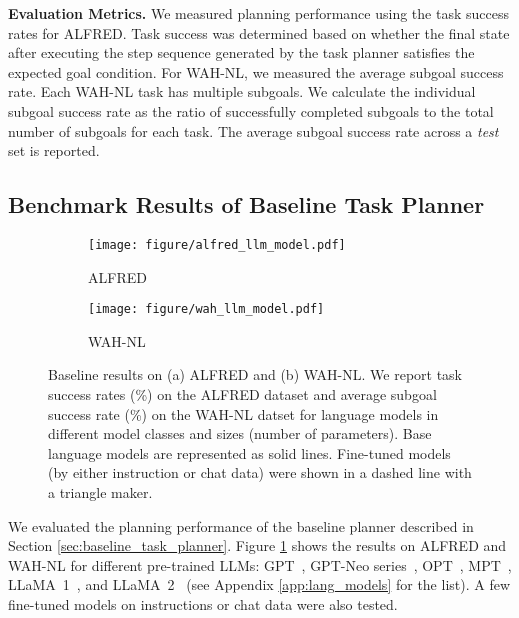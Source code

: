 \textbf{Evaluation Metrics.} We measured planning performance using the task success rates for ALFRED. Task success was determined based on whether the final state after executing the step sequence generated by the task planner satisfies the expected goal condition. For WAH-NL, we measured the average subgoal success rate. Each WAH-NL task has multiple subgoals. We calculate the individual subgoal success rate as the ratio of successfully completed subgoals to the total number of subgoals for each task. The average subgoal success rate across a \textit{test} set is reported.

\subsection{Benchmark Results of Baseline Task Planner}
\label{subsec:baseline_experiment}

\begin{figure}[t]
\centering
\vspace{-4mm}
\begin{subfigure}{0.49\textwidth}
    \centering
    \texttt{[image: figure/alfred\_llm\_model.pdf]}
    \caption{ALFRED}
\end{subfigure}
\begin{subfigure}{0.49\textwidth}
    \centering
    \texttt{[image: figure/wah\_llm\_model.pdf]}
    \caption{WAH-NL}
\end{subfigure}
\vspace{-3mm}
\caption{Baseline results on (a) ALFRED and (b) WAH-NL. We report task success rates (\%) on the ALFRED dataset and average subgoal success rate (\%) on the WAH-NL datset for language models in different model classes and sizes (number of parameters). Base language models are represented as solid lines. Fine-tuned models (by either instruction or chat data) were shown in a dashed line with a triangle maker.}
\label{fig:llm_model}
\end{figure}

We evaluated the planning performance of the baseline planner described in Section \ref{sec:baseline_task_planner}. Figure \ref{fig:llm_model} shows the results on ALFRED and WAH-NL for different pre-trained LLMs: GPT~\citep{brown2020language}, GPT-Neo series~\citep{gpt-neo, gpt-j, black2022gpt}, OPT~\citep{zhang2022opt}, MPT~\citep{MPT7B, MPT30B}, LLaMA~1~\citep{llama}, and LLaMA~2~\citep{touvron2023llama} (see Appendix \ref{app:lang_models} for the list). A few fine-tuned models on instructions or chat data were also tested.

